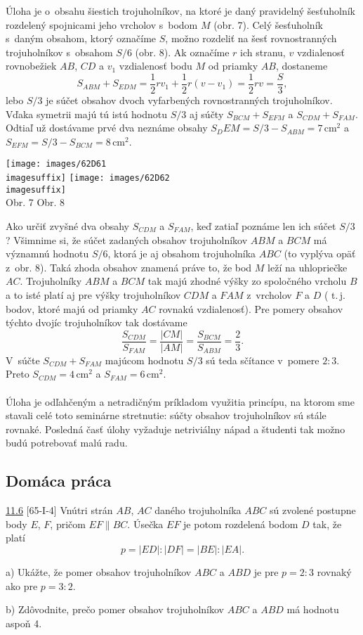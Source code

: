 \rieh Úloha je o~obsahu šiestich trojuholníkov, na ktoré je daný pravidelný šesťuholník rozdelený spojnicami jeho vrcholov s~bodom $M$ (obr. 7). Celý šesťuholník s~daným obsahom, ktorý označíme $S$, možno rozdeliť na šesť rovnostranných trojuholníkov s~obsahom $S/6$ (obr. 8). Ak označíme $r$ ich stranu, $v$ vzdialenosť rovnobežiek $AB$, $CD$ a $v_1$ vzdialenosť bodu $M$ od priamky $AB$, dostaneme
$$S_{ABM} + S_{EDM} =\frac{1}{2}rv_1 +\frac{1}{2}r(v - v_1 ) = \frac{1}{2} rv =\frac{S}{3},$$
lebo $S/3$ je súčet obsahov dvoch vyfarbených rovnostranných trojuholníkov. Vďaka symetrii majú tú istú hodnotu $S/3$ aj súčty $S_{BCM} +S_{EFM}$ a $S_{CDM} +S_{FAM}$. Odtiaľ už dostávame prvé dva neznáme obsahy $S_DEM = S/3 - S_{ABM} = 7$\,cm$^2$ a $S_{EFM}= S/3 - S_{BCM} = 8$\,cm$^2$.
\begin{center}
\texttt{[image: images/62D61\\imagesuffix]} \texttt{[image: images/62D62\\imagesuffix]}\\

Obr. 7  \hspace{160pt} Obr. 8
\end{center}
Ako určiť zvyšné dva obsahy $S_{CDM}$ a $S_{FAM}$, keď zatiaľ poznáme len ich súčet $S/3$? Všimnime si, že súčet zadaných obsahov trojuholníkov $ABM$ a $BCM$ má významnú hodnotu $S/6$, ktorá je aj obsahom trojuholníka $ABC$ (to vyplýva opäť z~obr. 8). Taká zhoda obsahov znamená práve to, že bod $M$ leží na uhlopriečke $AC$. Trojuholníky $ABM$ a $BCM$ tak majú zhodné výšky zo spoločného vrcholu $B$ a to isté platí aj pre výšky trojuholníkov $CDM$ a $FAM$ z~vrcholov $F$ a $D$ ( t.\,j. bodov, ktoré majú od priamky $AC$ rovnakú vzdialenosť). Pre pomery obsahov týchto dvojíc trojuholníkov tak dostávame
$$\frac{S_{CDM}}{S_{FAM}}=\frac{|CM|}{|AM|}=\frac{S_{BCM}}{S_{ABM}}=\frac{2}{3}.$$
V~súčte $S_{CDM} + S_{FAM}$ majúcom hodnotu $S/3$ sú teda sčítance v~pomere $2 : 3$. Preto $S_{CDM} =4$\,cm$^2$ a $S_{FAM} = 6$\,cm$^2$.\\
\\
\kom Úloha je odľahčeným a netradičným príkladom využitia princípu, na ktorom sme stavali celé toto seminárne stretnutie: súčty obsahov  trojuholníkov sú stále rovnaké. Posledná časť úlohy vyžaduje netriviálny nápad a študenti tak možno budú potrebovať malú radu.
\subsection*{Domáca práca}
\begin{tcolorbox}[breakable,notitle,boxrule=0pt,colback=light-gray,colframe=light-gray]\ul{11.6} [65-I-4] Vnútri strán $AB$, $AC$ daného trojuholníka $ABC$ sú zvolené postupne body $E$, $F$, pričom $EF \parallel BC$. Úsečka $EF$ je potom rozdelená bodom $D$ tak, že platí $$p = |ED| : |DF | = |BE| : |EA|.$$

a) Ukážte, že pomer obsahov trojuholníkov $ABC$ a $ABD$ je pre $p = 2 : 3$ rovnaký ako pre $p = 3 : 2$.

b) Zdôvodnite, prečo pomer obsahov trojuholníkov $ABC$ a $ABD$ má hodnotu aspoň 4.

\end{tcolorbox}

